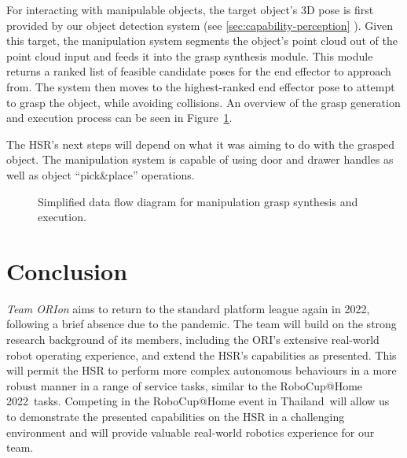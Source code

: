 \documentclass[runningheads,a4paper]{llncs}
\newcommand{\robospecs}{%
  \newpage%
  \pagenumbering{gobble}%
}
\newcommand{\teamori}{Team ORIon}
\newcommand{\competitionyear}{2022}
\newcommand{\competitioncountry}{Thailand}
\begin{document}
For interacting with manipulable objects, the target object's 3D pose is first provided by our object detection system (see \ref{sec:capability-perception} ). 
%
Given this target, the manipulation system segments the object's point cloud out of the point cloud input and feeds it into the grasp synthesis module.
%
This module returns a ranked list of feasible candidate poses for the end effector to approach from.
%
The system then moves to the highest-ranked end effector pose to attempt to grasp the object, while avoiding collisions.
%
An overview of the grasp generation and execution process can be seen in Figure~\ref{fig:manipulation_data_flow}.

The HSR's next steps will depend on what it was aiming to do with the grasped object.
%
The manipulation system is capable of using door and drawer handles as well as object ``pick\&place'' operations.


\begin{figure}[!t]
	\centering
	\vspace{-10pt}%
	\caption{Simplified data flow diagram for manipulation grasp synthesis and execution.}
	\label{fig:manipulation_data_flow}
	\vspace{-3ex}
\end{figure}


\section{Conclusion}
\textit{\teamori{}} aims to return to the standard platform league again in \competitionyear, following a brief absence due to the pandemic. The team will build on the strong research background of its members, including the ORI's extensive real-world robot operating experience, and extend the HSR's capabilities as presented. This will permit the HSR to perform more complex autonomous behaviours in a more robust manner in a range of service tasks, similar to the RoboCup@Home \competitionyear\ tasks. 
Competing in the RoboCup@Home event in \competitioncountry\ will allow us to demonstrate the presented capabilities on the HSR in a challenging environment and will provide valuable real-world robotics experience for our team.





\robospecs

\end{document}
